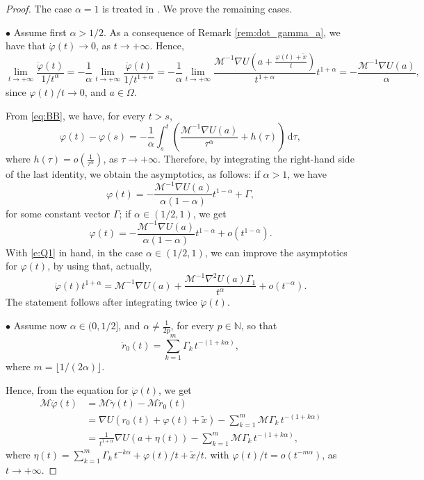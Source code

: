 \documentclass[a4paper,10pt]{amsart}
\newcommand{\ud}{\mathrm{d}}
\theoremstyle{plain}
\theoremstyle{definition}
\numberwithin{equation}{section}
\numberwithin{thm}{section}
\begin{document}
\begin{proof}
    The case $\alpha=1$ is treated in \cite{PolimeniTerracini}. We prove the remaining cases.

    \noindent $\bullet$ Assume first $\alpha >1/2$. As a consequence of Remark \ref{rem:dot_gamma_a}, we have that $\dot \varphi(t) \to 0$, as $t \rightarrow+\infty$. Hence,
    \begin{equation}
    \label{eq:BB}
    \lim_{t \rightarrow+\infty}\frac{\dot \varphi(t)}{1/t^{\alpha}}=-\frac1\alpha\lim_{t \rightarrow+\infty}\frac{\ddot \varphi(t)}{1/t^{1+\alpha}}=-\frac{1}{\alpha}\lim_{t \rightarrow+\infty}\frac{\mathcal M^{-1}\nabla U\left(a+\frac{\varphi(t)+\tilde x}{t}\right)}{t^{1+\alpha}}t^{1+\alpha}=-\frac{\mathcal M^{-1}\nabla U(a)}{\alpha},
    \end{equation}
    since $\varphi(t)/t \to 0$, and $a \in \Omega$. 
    
    From \eqref{eq:BB}, we have, for every $t>s$,
    \[
    \varphi(t)-\varphi(s)=-\frac1\alpha\int_s^t\left( \frac{\mathcal M^{-1}\nabla U(a)}{\tau^\alpha}+h(\tau)\right)\,\ud\tau,
    \]
    where $h(\tau)=o\left(\frac1{\tau^\alpha}\right)$, as $\tau \rightarrow+\infty$. Therefore, by integrating the right-hand side of the last identity, we obtain the asymptotics, as follows: if $\alpha >1$, we have
    \[
    \varphi(t)= -\frac{\mathcal M^{-1}\nabla U(a)}{\alpha(1-\alpha)}t^{1-\alpha}+\Gamma,
    \]
    for some constant vector $\Gamma$; if $\alpha \in (1/2,1)$, we get
    \begin{equation}
    \label{e:Q1}
    \varphi(t)= -\frac{\mathcal M^{-1}\nabla U(a)}{\alpha(1-\alpha)}t^{1-\alpha}+o(t^{1-\alpha}).
    \end{equation}
    With \eqref{e:Q1} in hand, in the case $\alpha \in (1/2,1)$, we can improve the asymptotics for $\varphi(t)$, by using that, actually,
    \[
    \ddot \varphi(t)t^{1+\alpha}=\mathcal{M}^{-1}\nabla U(a)+\frac{\mathcal{M}^{-1}\nabla^2 U(a)\Gamma_1}{t^{\alpha}}+o\left(t^{-\alpha}\right).
    \]
    The statement follows after
    integrating twice $\ddot \varphi(t)$.

    \noindent $\bullet$ Assume now $\alpha\in (0,1/2]$, and $\alpha \neq \frac{1}{2p}$, for every $p \in \mathbb{N}$, so that
    \[
    \ddot r_0(t)=\sum_{k=1}^{m}\Gamma_k\,t^{-(1+k\alpha)},
    \]
    where $m=\lfloor 1/(2\alpha)\rfloor$.
    
    Hence, from the equation for $\ddot \varphi(t)$, we get
    \[
    \begin{aligned}
        \mathcal M\ddot \varphi(t)&=\mathcal M \ddot \gamma(t)-\mathcal M\ddot r_0(t)
        \\
        &= \nabla U(r_0(t)+\varphi(t)+\tilde x)-\sum_{k=1}^{m}\mathcal M \Gamma_k\,t^{-(1+k\alpha)}
        \\
        &=\frac{1}{t^{1+\alpha}}\nabla U(a+\eta(t))-\sum_{k=1}^{m}\mathcal M \Gamma_k\,t^{-(1+k\alpha)},
    \end{aligned}
    \]
    where $\eta(t)=\sum_{k=1}^{m}\Gamma_k\,t^{-k\alpha}+\varphi(t)/t+\tilde x/t$. with $\varphi(t)/t = o(t^{-m \alpha})$, as $t \rightarrow+\infty$.


\end{proof}
\end{document}
